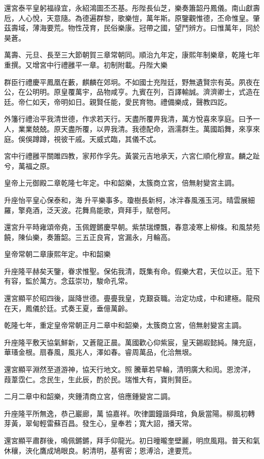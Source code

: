 \begin{pinyinscope}
還宮泰平皇躬福祿宜，永紹鴻圖丕丕基。彤陛長仙芝，樂奏簫韶丹鳳儀。南山獻壽卮，人心悅，天意隨。為德遍群黎，歌樂愷，萬年斯。原鑒觀惟德，丕命惟皇。肇茲壽域，薄海要荒。物性茂育，民俗樂康。冠帶之國，望鬥辨方。曰惟萬年，同於昊蒼。

萬壽、元旦、長至三大節朝賀三章常朝同。順治九年定，康熙年制樂章，乾隆七年重撰。又增宮中行禮雝平一章。初制附載。丹陛大樂

群臣行禮慶平鳳凰在藪，麒麟在郊坰。不如國士充陛廷，野無遺賢宗有英。夙夜在公，在公明明。原皇覆萬宇，品物咸亨。九賓在列，百譯輸誠。濟濟卿士，式造在廷。帝仁如天，帝明如日。親賢任能，愛民育物。禮備樂成，聲教四訖。

外籓行禮治平我清世德，作求若天行。天盡所覆畀我清，萬方悅喜來享庭。曰予一人，業業兢兢。原天盡所覆，以畀我清。我德配命，涵濡群生。萬國蹈舞，來享來庭。俁俁蹲蹲，視彼干戚。天威式臨，其儀不忒。

宮中行禮雝平關雎四教，家邦作孚先。黃裳元吉地承天，六宮仁順化穆宣。麟之趾兮，萬福之原。

皇帝上元御殿二章乾隆七年定。中和韶樂，太簇商立宮，倍無射變宮主調。

升座怡平皇心保泰和，海升平樂事多。瓊樹長新柯，冰泮春風漲玉河。晴雲展細羅，擎堯酒，泛天波。花舞鳥能歌，齊拜手，賦卷阿。

還宮升平時雍頌帝堯，玉佩鏗鏘慶早朝。紫禁瑞煙飄，春意凌寒上柳條。和風禁苑饒，陳仙樂，奏簫韶。三五正良宵，宮漏永，月輪高。

皇帝常朝二章康熙年定。中和韶樂

升座隆平赫矣天鑒，眷求惟聖。保佑我清，既集有命。假樂大君，天位以正。蒞下有容，監於萬方。念茲崇功，駿命孔常。

還宮顯平於昭四後，誕降世德。亹亹我皇，克艱袞職。治定功成，中和建極。龍飛在天，鳳儀於廷。式奏王夏，垂億萬齡。

乾隆七年，重定皇帝常朝正月二章中和韶樂，太簇商立宮，倍無射變宮主調。

升座隆平敷天協氣鮮新，又蒼龍正晨。萬國歡心仰紫宸，皇天錫嘏懿純。陳充庭，華瑵金根。扇春風，風兆人，澤如春。睿周萬品，化洽無垠。

還宮顯平淵然至道游神，協天行地文。照騰華若早輪，清明廣大和訚。恩滂洋，葭葦霑仁。念民生，生此辰，酌於民。瑞惟大有，寶則賢臣。

二月二章中和韶樂，夾鍾清商立宮，倍應鍾變宮二調。

升座隆平所無逸，恭己巖廊，萬協嘉祥。吹律圜鐘諧舜琯，負扆當陽。柳風初轉芽黃，翠甸輕雷蘇百昌。發生心，皇奉若；寬大詔，播天常。

還宮顯平肅群後，鳴佩鏘鏘，拜手仰龍光。初日曈曨奎壁麗，明庶風翔。普天和氣休穰，浹化鷹成鳩眼良。躬清明，基宥密；恩溥洽，達要荒。


\end{pinyinscope}
